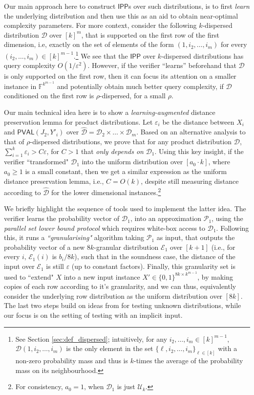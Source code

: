 \documentclass[11pt]{article}
\newcommand{\PVAL}{\mathsf{PVAL}}
\newcommand{\IPP}{\mathsf{IPP}}
\newcommand{\F}{\mathbb{F}}
\newcommand{\sU}{\mathcal{U}}
\newcommand{\sD}{\mathcal{D}}
\newcommand{\sP}{\mathcal{P}}
\begin{document}
Our main approach here to construct $\IPP$s over such distributions, is to first \textit{learn} the underlying distribution and then use this as an aid to obtain near-optimal complexity parameters. For more context, consider the following $k$-dispersed distribution $\sD$ over $[k]^m$, that is supported on the first row of the first dimension, i.e, exactly on the set of elements of the form $(1,i_2, \dots, i_m)$ for every $(i_2, \dots, i_m) \in [k]^{m-1}$.\footnote{See Section \ref{sec:def_dispersed}; intuitively, for any $i_2, \dots, i_m \in [k]^{m-1}$, $\sD(1,i_2, \dots, i_m)$ is the only element in the set $\{\ell, i_2, \dots, i_m\}_{\ell \in [k]}$ with a non-zero probability mass and thus is $k$-times the average of the probability mass on its neighbourhood.} We see that the $\IPP$ over $k$-dispersed distributions has query complexity $O(1/\varepsilon^2)$. However, if the verifier ``learns'' beforehand that $\sD$ is only supported on the first row, then it can focus its attention on a smaller instance in $\F^{k^{m-1}}$ and potentially obtain much better query complexity, if $\sD$ conditioned on the first row is $\rho$-dispersed, for a small $\rho$.

Our main technical idea here is to show a \textit{learning-augmented} distance preservation lemma for product distributions. Let $\varepsilon_i$ be the distance between $X_i$ and $\PVAL(J_2, Y'_i)$ over $\hat{\sD} = \sD_2 \times \dots \times \sD_m$. Based on an alternative analysis to that of $\rho$-dispersed distributions, we prove that for any product distribution $\sD$, $\sum_{i=1}^k \varepsilon_i > C \varepsilon$, for $C > 1$ that \textit{only depends on} $\sD_1$. Using this key insight, if the verifier ``transformed" $\sD_1$ into the uniform distribution over $[a_0 \cdot k]$, where $a_0 \geq 1$ is a small constant, then we get a similar expression as the uniform distance preservation lemma, i.e., $C = O(k)$, despite still measuring distance according to $\hat{\sD}$ for the lower dimensional instances.\footnote{For consistency, $a_0 = 1$, when $\sD_1$ is just $\sU_k$.} 

We briefly highlight the sequence of tools used to implement the latter idea. The verifier learns the probability vector of $\sD_1$, into an approximation $\sP_1$, using the \textit{parallel set lower bound protocol} \cite{BT06} which requires white-box access to $\sD_1$. Following this, it runs a \textit{``granularising"} algorithm taking $\sP_1$ as input, that outputs the probability vector of a new $8k$-granular distribution $\mathcal{E}_1$ over $[k+1]$ (i.e., for every $i$, $\mathcal{E}_1(i)$ is $b_i/8k$), such that in the soundness case, the distance of the input over $\mathcal{E}_1$ is still $\varepsilon$ (up to constant factors). Finally, this granularity set is used to ``extend" $X$ into a new input instance $X' \in \{0,1\}^{8k \times k^{m-1}}$, by making copies of each row according to it's granularity, and we can thus, equivalently consider the underlying row distribution as the uniform distribution over $[8k]$. The last two steps build on ideas from \cite{Gol20} for testing unknown distributions, while our focus is on the setting of testing with an implicit input.
\end{document}
